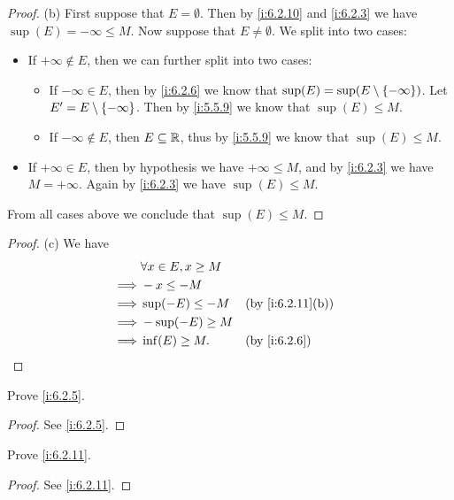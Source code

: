 \begin{proof}{(b)}
  First suppose that \(E = \emptyset\).
  Then by \cref{i:6.2.10} and \cref{i:6.2.3} we have \(\sup(E) = -\infty \leq M\).
  Now suppose that \(E \neq \emptyset\).
  We split into two cases:
  \begin{itemize}
    \item If \(+\infty \not\in E\), then we can further split into two cases:
          \begin{itemize}
            \item If \(-\infty \in E\), then by \cref{i:6.2.6} we know that \(\sup(E) = \sup(E \setminus \left\lbrace-\infty\right\rbrace)\).
                  Let \(E' = E \setminus \left\lbrace-\infty\right\rbrace\).
                  Then by \cref{i:5.5.9} we know that \(\sup(E) \leq M\).
            \item If \(-\infty \notin E\), then \(E \subseteq \mathbb{R}\), thus by \cref{i:5.5.9} we know that \(\sup(E) \leq M\).
          \end{itemize}
    \item If \(+\infty \in E\), then by hypothesis we have \(+\infty \leq M\), and by \cref{i:6.2.3} we have \(M = +\infty\).
          Again by \cref{i:6.2.3} we have \(\sup(E) \leq M\).
  \end{itemize}
  From all cases above we conclude that \(\sup(E) \leq M\).
\end{proof}

\begin{proof}{(c)}
  We have
  \begin{align*}
             & \forall x \in E, x \geq M                       \\
    \implies & -x \leq -M                                      \\
    \implies & \sup(-E) \leq -M          &  & \by{i:6.2.11}[b] \\
    \implies & -\sup(-E) \geq M                                \\
    \implies & \inf(E) \geq M.           &  & \by{i:6.2.6}
  \end{align*}
\end{proof}

\exercisesection

\begin{ex}\label{i:ex:6.2.1}
  Prove \cref{i:6.2.5}.
\end{ex}

\begin{proof}
  See \cref{i:6.2.5}.
\end{proof}

\begin{ex}\label{i:ex:6.2.2}
  Prove \cref{i:6.2.11}.
\end{ex}

\begin{proof}
  See \cref{i:6.2.11}.
\end{proof}
